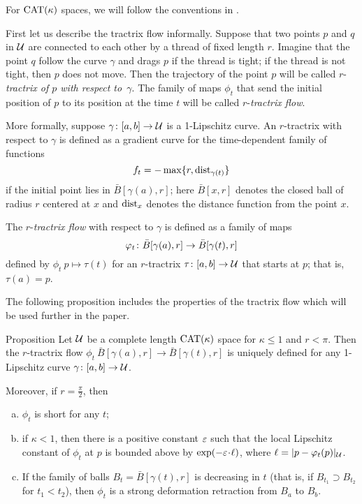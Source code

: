 \documentclass[oneside,a4paper, 12pt]{article}
\begin{document}
For $\mathrm{CAT}(\kappa)$ spaces, we will follow the conventions in \cite{akp}.

First let us describe the tractrix flow informally.
Suppose that two points $p$ and $q$ in ${\mathcal{U}}$ are connected to each other by a thread of fixed length $r$.
Imagine that the point $q$ follow the curve $\gamma$ and drags $p$ if the thread is tight; 
if the thread is not tight, then $p$ does not move.
Then the trajectory of the point $p$ will be called $r$-\emph{tractrix of $p$ with respect to~$\gamma$}.
The family of maps $\phi_t$ that send the initial position of $p$ to its position at the time $t$ will be called $r$-\emph{tractrix flow}.

More formally, suppose $\gamma\colon[a,b]\to \mathcal{U}$ is a 1-Lipschitz curve. 
An $r$-tractrix with respect to $\gamma$ is defined as a gradient curve for the time-dependent family of functions 
\[f_t=- \max\{r,\mathop{\rm dist}\nolimits_{\gamma(t)}\}\]
if the initial point lies in $\bar B[\gamma(a),r]$;
here $\bar B[x,r]$ denotes the closed ball of radius $r$ centered at $x$ and $\mathop{\rm dist}\nolimits_{x}$ denotes the distance function from the point $x$.

The $r$-\emph{tractrix flow} with respect to $\gamma$ is defined as a family of maps
\[\phi_t\:\bar B[\gamma(a),r]\z\to\bar B[\gamma(t),r]\]
defined by $\phi_t\:p\mapsto \tau(t)$
for an $r$-tractrix $\tau\colon[a,b]\to \mathcal{U}$ that starts at $p$; that is, $\tau(a)=p$.

The following proposition includes the properties of the tractrix flow which will be used further in the paper.

\begin{thm}{Proposition}\label{prop-def}
Let $\mathcal{U}$ be a complete length $\mathrm{CAT}(\kappa)$ space for $\kappa\le 1$ and $r<\pi$.
Then the $r$-tractrix flow $\phi_t\:\bar B[\gamma(a),r]\to\bar B[\gamma(t),r]$ is uniquely defined for any  1-Lipschitz curve $\gamma\colon[a,b]\to \mathcal{U}$.

Moreover, if $r=\tfrac\pi2$, then
\begin{enumerate}[(a)]
 \item\label{non-strict} $\phi_t$ is short for any $t$;
 \item\label{strict} if $\kappa<1$, then there is a positive constant $\varepsilon$ such that the local Lipschitz constant of $\phi_t$ at $p$ is bounded above by $\exp(-\eps\cdot\ell)$, where $\ell=|p-\varphi_t(p)|_{\mathcal{U}}$.
 \item\label{sharafutdinov} If the family of balls $B_t=\bar B[\gamma(t),r]$ is decreasing in $t$ (that is, if $B_{t_1}\supset B_{t_2}$ for $t_1<t_2$), then $\phi_t$ is a strong deformation retraction from $B_a$ to $B_b$.
\end{enumerate}
\end{thm}
\end{document}
